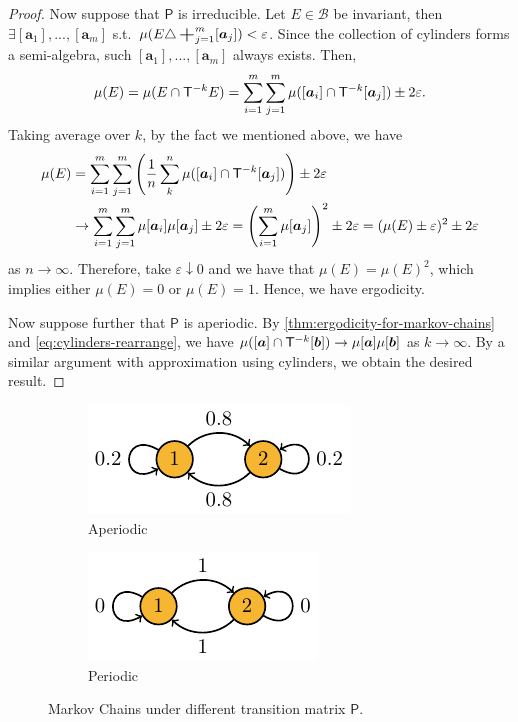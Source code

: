 \documentclass[a4paper]{article}
\begin{document}
\begin{proof}
	Now suppose that $\mathsf{P}$ is irreducible.
	Let $E\in\mathcal{B}$ be invariant,
	then $\exists[\boldsymbol{a}_1],...,[\boldsymbol{a}_m]$ s.t.\ $\mu(E\triangle\bigplus_{j=1}^{m}[\boldsymbol{a}_{j}])<\varepsilon$.
	Since the collection of cylinders forms a semi-algebra,
	such $[\boldsymbol{a}_1],...,[\boldsymbol{a}_m]$ always exists.
	Then,
	\begin{align*}
		\mu(E)
		= \mu(E\cap \mathsf{T}\inv[k]E)
		= \sum_{i=1}^{m} \sum_{j=1}^{m} \mu([\boldsymbol{a}_i]\cap \mathsf{T}\inv[k][\boldsymbol{a}_j]) \pm 2\varepsilon.
	\end{align*}
	Taking average over $k$, by the fact we mentioned above, we have
	\begin{align*}
		\mu(E)
		&=
		\sum_{i=1}^{m} \sum_{j=1}^{m}
		\left(
		\frac1n \sum_{k}^{n} \mu([\boldsymbol{a}_i]\cap \mathsf{T}\inv[k][\boldsymbol{a}_j])
		\right)
		\pm 2\varepsilon \nonumber\\
		&\to
		\sum_{i=1}^{m} \sum_{j=1}^{m}
		\mu[\boldsymbol{a}_i] \mu[\boldsymbol{a}_j] \pm 2\varepsilon
		= \left( \sum_{i=1}^{m} \mu[\boldsymbol{a}_j] \right)^2 \pm 2\varepsilon
		= (\mu(E)\pm\varepsilon)^2 \pm 2\varepsilon
	\end{align*}
	as $n\to\infty$.
	Therefore,
	take $\varepsilon\downarrow0$ and we have that $\mu(E)=\mu(E)^2$,
	which implies either $\mu(E)=0$ or $\mu(E)=1$.
	Hence, we have ergodicity.

	Now suppose further that $\mathsf{P}$ is aperiodic.
	By \autoref{thm:ergodicity-for-markov-chains} and \eqref{eq:cylinders-rearrange},
	we have
	$\mu([\boldsymbol{a}]\cap\mathsf{T}\inv[k][\boldsymbol{b}]) \to \mu[\boldsymbol{a}] \mu[\boldsymbol{b}]$
	as $k\to\infty$.
	By a similar argument with approximation using cylinders,
	we obtain the desired result.
\end{proof}

\begin{figure}[h]
	\centering
	\begin{subfigure}{0.4\textwidth}
		\centering
		\includegraphics[scale=1]{figures/markov-periodic.pdf}
		\caption{Aperiodic}
		\label{fig:aperiodic}
	\end{subfigure}
	\begin{subfigure}{0.4\textwidth}
		\centering
		\includegraphics[scale=1]{figures/markov-aperiodic.pdf}
		\caption{Periodic}
		\label{fig:periodic}
	\end{subfigure}
	\caption{Markov Chains under different transition matrix $\mathsf{P}$.}
	\label{fig:markov-chains}
\end{figure}
\end{document}
